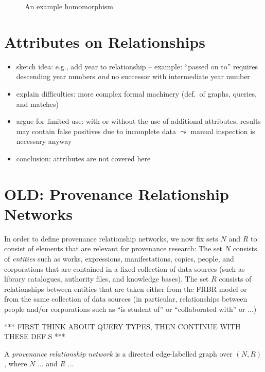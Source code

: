 \begin{figure}
  \caption{An example homomorphism}
  \label{fig:example_hmph}
\end{figure}



\section{Attributes on Relationships}


\begin{itemize}
  \item
    sketch idea: e.g., add year to relationship  -- example: ``passed on to'' requires descending year numbers \emph{and} no successor with intermediate year number
  \item
    explain difficulties: more complex formal machinery (def.\ of graphs, queries, and matches)
  \item
    argue for limited use: with or without the use of additional attributes, results may contain false positives due to incomplete data $\leadsto$ manual inspection is necessary anyway
  \item
    conclusion: attributes are not covered here
\end{itemize}



\section{OLD: Provenance Relationship Networks}

In order to define provenance relationship networks, we now fix sets $N$ and $R$ to consist
of elements that are relevant for provenance research:
The set $N$ consists of \emph{entities} such as 
works, expressions, manifestations, copies, people, and corporations
that are contained in a fixed collection of data sources (such as library catalogues,
authority files, and knowledge bases). The set $R$ consists of relationships
between entities that are taken either from the FRBR model
or from the same collection of data sources (in particular, relationships between people and/or corporations
such as ``is student of'' or ``collaborated with'' or ...)

*** FIRST THINK ABOUT QUERY TYPES, THEN CONTINUE WITH THESE DEF.S ***


A \emph{provenance relationship network} is a directed edge-labelled graph over $(N,R)$,
where $N$ ... and $R$ ... 
